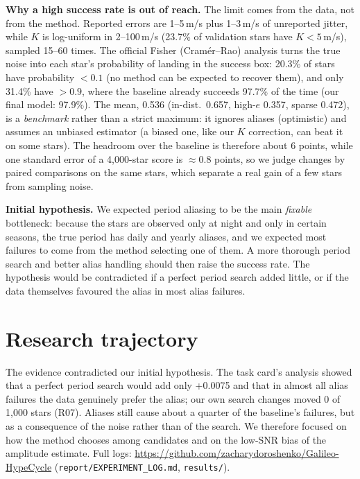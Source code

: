\documentclass{article}
\begin{document}
\textbf{Why a high success rate is out of reach.}
The limit comes from the data, not from the method. Reported errors are
1--5\,m/s plus 1--3\,m/s of unreported jitter, while $K$ is log-uniform in
2--100\,m/s (23.7\% of validation stars have $K<5$\,m/s), sampled 15--60
times. The official Fisher (Cram\'er--Rao) analysis turns the true noise
into each star's probability of landing in the success box: 20.3\% of
stars have probability $<0.1$ (no method can be expected to recover them),
and only 31.4\% have $>0.9$, where the baseline already succeeds 97.7\% of
the time (our final model: 97.9\%). The mean, 0.536 (in-dist.\ 0.657,
high-$e$ 0.357, sparse 0.472), is a \emph{benchmark} rather than a strict
maximum: it ignores aliases (optimistic) and assumes an unbiased estimator
(a biased one, like our $K$ correction, can beat it on some stars). The
headroom over the baseline is therefore about 6 points, while one standard
error of a 4,000-star score is $\approx$0.8 points, so we judge changes by
paired comparisons on the same stars, which separate a real gain of a few
stars from sampling noise.

\textbf{Initial hypothesis.} We expected period aliasing to be the main
\emph{fixable} bottleneck: because the stars are observed only at night and only in
certain seasons, the true period has daily and yearly aliases, and we
expected most failures to come from the method selecting one of them.
A more thorough period search and better alias handling should then raise
the success rate. The hypothesis would be contradicted if a perfect period
search added little, or if the data themselves favoured the alias in most
alias failures.

\section{Research trajectory}
The evidence contradicted our initial hypothesis. The task card's analysis
showed that a perfect period search would add only +0.0075 and that in
almost all alias failures the data genuinely prefer the alias; our own
search changes moved 0 of 1,000 stars (R07). Aliases still cause about a
quarter of the baseline's failures, but as a consequence of the noise
rather than of the search. We therefore focused on how the method chooses
among candidates and on the low-SNR bias of the amplitude estimate. Full logs:
\url{https://github.com/zacharydoroshenko/Galileo-HypeCycle}
(\texttt{report/EXPERIMENT\_LOG.md}, \texttt{results/}).
\end{document}
